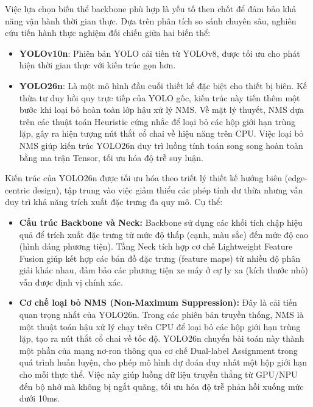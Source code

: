 	Việc lựa chọn biến thể backbone phù hợp là yếu tố then chốt để đảm bảo khả năng vận hành thời gian thực. Dựa trên phân tích so sánh chuyên sâu\cite{Sapkota2025UltralyticsYE, Hidayatullah2025YOLOv8TY, yolo26_ultralytics}, nghiên cứu tiến hành thực nghiệm đối chiếu giữa hai biến thể:
	\begin{itemize}
		\item \textbf{YOLOv10n}: Phiên bản YOLO cải tiến từ YOLOv8, được tối ưu cho phát hiện thời gian thực với kiến trúc gọn hơn.
		\item \textbf{YOLO26n}: Là một mô hình đầu cuối thiết kế đặc biệt cho thiết bị biên. Kế thừa tư duy hồi quy trực tiếp của YOLO gốc, kiến trúc này tiến thêm một bước khi loại bỏ hoàn toàn lớp hậu xử lý NMS\cite{yolo26_ultralytics}. Về mặt lý thuyết, NMS dựa trên các thuật toán Heuristic cứng nhắc để loại bỏ các hộp giới hạn trùng lặp, gây ra hiện tượng nút thắt cổ chai về hiệu năng trên CPU. Việc loại bỏ NMS giúp kiến trúc YOLO26n duy trì luồng tính toán song song hoàn toàn bằng ma trận Tensor, tối ưu hóa độ trễ suy luận.
	\end{itemize}
	
	Kiến trúc của YOLO26n được tối ưu hóa theo triết lý thiết kế hướng biên (edge-centric design), tập trung vào việc giảm thiểu các phép tính dư thừa nhưng vẫn duy trì khả năng trích xuất đặc trưng đa quy mô. Cụ thể:

	\begin{itemize}
    	\item \textbf{Cấu trúc Backbone và Neck:} Backbone sử dụng các khối tích chập hiệu quả để trích xuất đặc trưng từ mức độ thấp (cạnh, màu sắc) đến mức độ cao (hình dáng phương tiện). Tầng Neck tích hợp cơ chế Lightweight Feature Fusion giúp kết hợp các bản đồ đặc trưng (feature maps) từ nhiều độ phân giải khác nhau, đảm bảo các phương tiện xe máy ở cự ly xa (kích thước nhỏ) vẫn được định vị chính xác.
    	\item \textbf{Cơ chế loại bỏ NMS (Non-Maximum Suppression):} Đây là cải tiến quan trọng nhất của YOLO26n. Trong các phiên bản truyền thống, NMS là một thuật toán hậu xử lý chạy trên CPU để loại bỏ các hộp giới hạn trùng lặp, tạo ra nút thắt cổ chai về tốc độ. YOLO26n chuyển bài toán này thành một phần của mạng nơ-ron thông qua cơ chế Dual-label Assignment trong quá trình huấn luyện, cho phép mô hình dự đoán duy nhất một hộp giới hạn cho mỗi thực thể. Việc này giúp luồng dữ liệu truyền thẳng từ GPU/NPU đến bộ nhớ mà không bị ngắt quãng, tối ưu hóa độ trễ phản hồi xuống mức dưới 10ms.
	\end{itemize}

